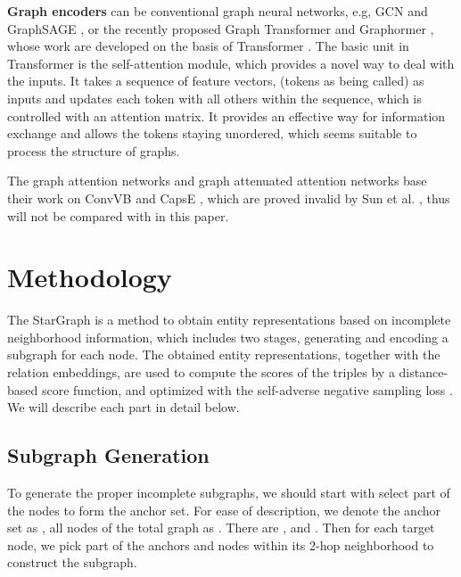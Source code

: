 \documentclass{article}
\begin{document}
\textbf{Graph encoders} can be conventional graph neural networks, e.g, GCN \cite{kipf2017semi} and GraphSAGE \cite{hamilton2017inductive}, or the recently proposed Graph Transformer \cite{dwivedi2021generalization} and Graphormer \cite{ying2021transformers}, whose work are developed on the basis of Transformer \cite{vaswani2017attention}.
The basic unit in Transformer is the self-attention module, which provides a novel way to deal with the inputs. It takes a sequence of feature vectors, (tokens as being called) as inputs and updates each token with all others within the sequence, which is controlled with an attention matrix. It provides an effective way for information exchange and allows the tokens staying unordered, which seems suitable to process the structure of graphs.

The graph attention networks \cite{nathani2019learning} and graph attenuated attention networks \cite{Wang2020KnowledgeGE} base their work on ConvVB \cite{dai2018novel} and CapsE \cite{vu2019capsule}, which are proved invalid by Sun et al. \cite{sun2020a}, thus will not be compared with in this paper.

\section{Methodology}
The StarGraph is a method to obtain entity representations based on incomplete neighborhood information, which includes two stages, generating and encoding  a subgraph for each node. The obtained entity representations, together with the relation embeddings, are used to compute the scores of the triples by a distance-based score function, and optimized with the self-adverse negative sampling loss \cite{sun2018rotate}. We will describe each part in detail below.

\subsection{Subgraph Generation}
To generate the proper incomplete subgraphs, we should start with select part of the nodes to form the anchor set. For ease of description, we denote the anchor set as , all nodes of the total graph as . There are , and . Then for each target node, we pick part of the anchors and nodes within its 2-hop neighborhood to construct the subgraph.
\end{document}
